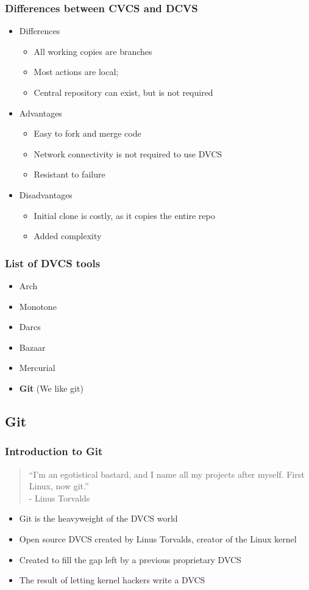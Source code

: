 \documentclass{beamer}
\begin{document}
\begin{frame}
  \frametitle{Differences between CVCS and DCVS}
  \begin{itemize}
    \item Differences
      \begin{itemize}
	\item All working copies are branches
	\item Most actions are local;
	\item Central repository can exist, but is not required
      \end{itemize}
    \item Advantages
      \begin{itemize}
	\item Easy to fork and merge code
	\item Network connectivity is not required to use DVCS
	\item Resistant to failure
      \end{itemize}
    \item Disadvantages
      \begin{itemize}
	\item Initial clone is costly, as it copies the entire repo
	\item Added complexity 
      \end{itemize}
  \end{itemize}
\end{frame}

\begin{frame}
  \frametitle{List of DVCS tools}
  \begin{itemize}
    \item Arch
    \item Monotone
    \item Darcs
    \item Bazaar
    \item Mercurial
    \item {\bf Git} (We like git)
  \end{itemize}
\end{frame}


\subsection{Git}

\begin{frame}
  \frametitle{Introduction to Git}
  \begin{quotation}
    ``I'm an egotistical bastard, and I name all my projects after myself. First Linux, now git.'' \\
    - Linus Torvalds
  \end{quotation}
  \begin{itemize}
    \item Git is the heavyweight of the DVCS world
    \item Open source DVCS created by Linus Torvalds, creator of the Linux kernel
    \item Created to fill the gap left by a previous proprietary DVCS
    \item The result of letting kernel hackers write a DVCS
  \end{itemize}
\end{frame}
\end{document}
